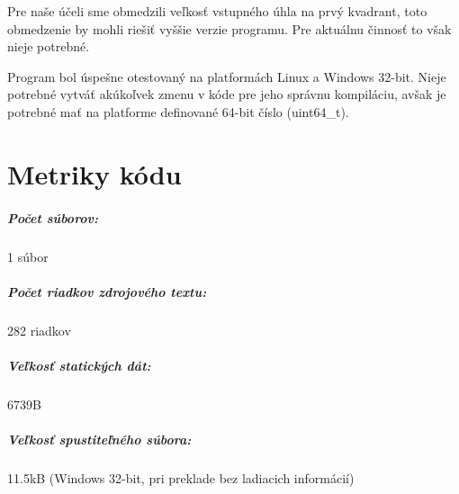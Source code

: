 \documentclass[12pt,a4paper,titlepage,final]{report}
\begin{document}
Pre naše účeli sme obmedzili veľkosť vstupného úhla na prvý kvadrant, toto obmedzenie by mohli riešiť vyššie verzie programu. Pre aktuálnu činnosť to však nieje potrebné.

Program bol úspešne otestovaný na platformách Linux a Windows 32-bit. Nieje potrebné vytváť akúkoľvek zmenu v kóde pre jeho správnu kompiláciu, avšak je potrebné mať na platforme definované 64-bit číslo (uint64\_t).




\appendix
\chapter{Metriky kódu} \label{metriky}
\paragraph{Počet súborov:} 1 súbor
\paragraph{Počet riadkov zdrojového textu:} 282 riadkov
\paragraph{Veľkosť statických dát:} 6739B
\paragraph{Veľkosť spustiteľného súbora:} 11.5kB (Windows 32-bit, pri preklade bez ladiacich informácií)
\end{document}
